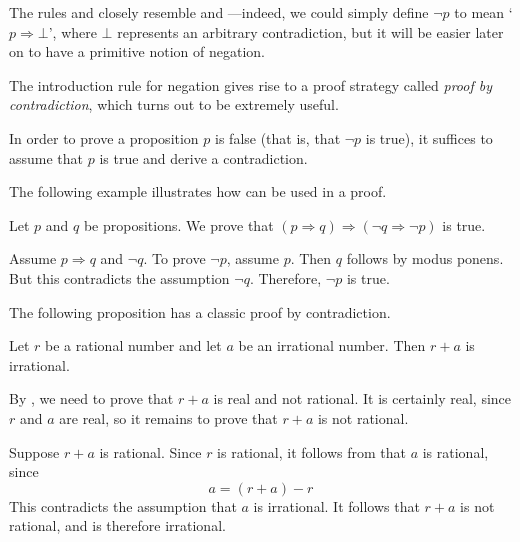\begin{aside}
The rules \introrule{\neg} and \elimrule{\neg} closely resemble \introrule{\Rightarrow} and \elimrule{\Rightarrow}---indeed, we could simply define $\neg p$ to mean `$p \Rightarrow \bot$', where $\bot$ represents an arbitrary contradiction, but it will be easier later on to have a primitive notion of negation.
\end{aside}

The introduction rule for negation \introrule{\neg} gives rise to a proof strategy called \textit{proof by contradiction}, which turns out to be extremely useful.

\begin{strategy}
\label{strProvingNegationsDirect}
\label{strProofByContradictionDirect}
In order to prove a proposition $p$ is false (that is, that $\neg p$ is true), it suffices to assume that $p$ is true and derive a contradiction.
\end{strategy}

The following example illustrates how  can be used in a proof.
\begin{example}
Let $p$ and $q$ be propositions. We prove that $(p \Rightarrow q) \Rightarrow (\neg q \Rightarrow \neg p)$ is true.

Assume $p \Rightarrow q$ and $\neg q$. To prove $\neg p$, assume $p$. Then $q$ follows by modus ponens. But this contradicts the assumption $\neg q$. Therefore, $\neg p$ is true.
\end{example}

The following proposition has a classic proof by contradiction.

\begin{proposition}
Let $r$ be a rational number and let $a$ be an irrational number. Then $r+a$ is irrational. 
\end{proposition}

\begin{cproof}
By , we need to prove that $r+a$ is real and not rational. It is certainly real, since $r$ and $a$ are real, so it remains to prove that $r+a$ is not rational.

Suppose $r+a$ is rational. Since $r$ is rational, it follows from  that $a$ is rational, since
\[
a = (r+a) - r
\]
This contradicts the assumption that $a$ is irrational. It follows that $r+a$ is not rational, and is therefore irrational.
\end{cproof}

